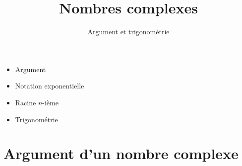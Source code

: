 








\title{{\bf Nombres complexes}}
\subtitle{Argument et trigonométrie}


\begin{frame}
  
  \debutmontitre

  \pause

{\footnotesize
\hfill
{}
\begin{minipage}{0.6\textwidth}
  \begin{itemize}
    \item<3-> Argument
    \item<4-> Notation exponentielle
    \item<5-> Racine $n$-ième
    \item<6-> Trigonométrie
  \end{itemize}
\end{minipage}
}
\vspace*{1cm}
\end{frame}

\setcounter{framenumber}{0}






\section{Argument d'un nombre complexe}

